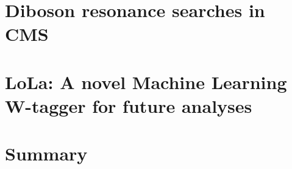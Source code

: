 \documentclass[a4paper, 11pt, twoside, openany]{ThesisStyle}
\begin{document}
%

\chapter{Diboson resonance searches in CMS}
\label{ch:diboson}
\vspace*{\fill}\newpage


\chapter{LoLa: A novel Machine Learning W-tagger for future analyses}
\label{ch:lola}
\vspace*{\fill}\newpage

	
\chapter{Summary}		
\vspace*{\fill}\newpage			


\appendix


\newpage





\end{document}
